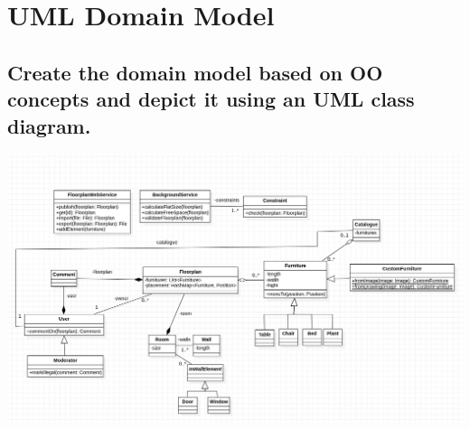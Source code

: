 \section{UML Domain Model}
		
		\subsection{Create the domain model based on OO concepts and depict it using an UML
			class diagram.}
        
        \includegraphics[width=\textwidth]{images/e_DomainModel.png}